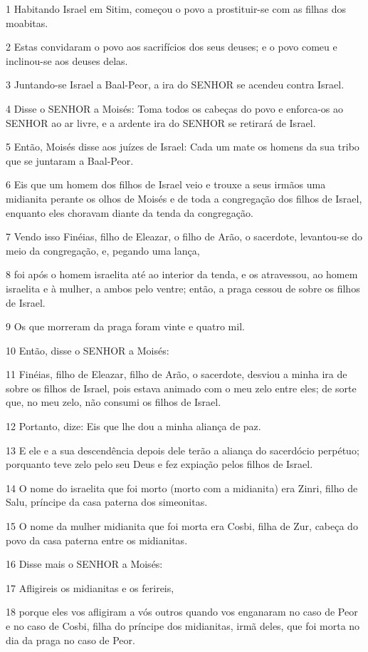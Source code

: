 \par 1 Habitando Israel em Sitim, começou o povo a prostituir-se com as filhas dos moabitas.
\par 2 Estas convidaram o povo aos sacrifícios dos seus deuses; e o povo comeu e inclinou-se aos deuses delas.
\par 3 Juntando-se Israel a Baal-Peor, a ira do SENHOR se acendeu contra Israel.
\par 4 Disse o SENHOR a Moisés: Toma todos os cabeças do povo e enforca-os ao SENHOR ao ar livre, e a ardente ira do SENHOR se retirará de Israel.
\par 5 Então, Moisés disse aos juízes de Israel: Cada um mate os homens da sua tribo que se juntaram a Baal-Peor.
\par 6 Eis que um homem dos filhos de Israel veio e trouxe a seus irmãos uma midianita perante os olhos de Moisés e de toda a congregação dos filhos de Israel, enquanto eles choravam diante da tenda da congregação.
\par 7 Vendo isso Finéias, filho de Eleazar, o filho de Arão, o sacerdote, levantou-se do meio da congregação, e, pegando uma lança,
\par 8 foi após o homem israelita até ao interior da tenda, e os atravessou, ao homem israelita e à mulher, a ambos pelo ventre; então, a praga cessou de sobre os filhos de Israel.
\par 9 Os que morreram da praga foram vinte e quatro mil.
\par 10 Então, disse o SENHOR a Moisés:
\par 11 Finéias, filho de Eleazar, filho de Arão, o sacerdote, desviou a minha ira de sobre os filhos de Israel, pois estava animado com o meu zelo entre eles; de sorte que, no meu zelo, não consumi os filhos de Israel.
\par 12 Portanto, dize: Eis que lhe dou a minha aliança de paz.
\par 13 E ele e a sua descendência depois dele terão a aliança do sacerdócio perpétuo; porquanto teve zelo pelo seu Deus e fez expiação pelos filhos de Israel.
\par 14 O nome do israelita que foi morto (morto com a midianita) era Zinri, filho de Salu, príncipe da casa paterna dos simeonitas.
\par 15 O nome da mulher midianita que foi morta era Cosbi, filha de Zur, cabeça do povo da casa paterna entre os midianitas.
\par 16 Disse mais o SENHOR a Moisés:
\par 17 Afligireis os midianitas e os ferireis,
\par 18 porque eles vos afligiram a vós outros quando vos enganaram no caso de Peor e no caso de Cosbi, filha do príncipe dos midianitas, irmã deles, que foi morta no dia da praga no caso de Peor.

